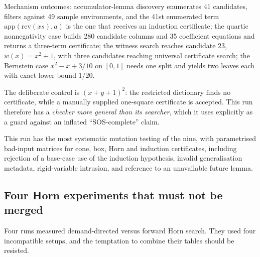 Mechanism outcomes: accumulator-lemma discovery enumerates 41 candidates,
filters against 49 sample environments, and the 41st enumerated term
$\mathrm{app}(\mathrm{rev}(xs),a)$ is the one that receives an induction
certificate; the quartic nonnegativity case builds 280 candidate columns and 35
coefficient equations and returns a three-term certificate; the witness search
reaches candidate 23, $w(x)=x^2+1$, with three candidates reaching universal
certificate search; the Bernstein case $x^2-x+3/10$ on $[0,1]$ needs one split
and yields two leaves each with exact lower bound $1/20$.

The deliberate control is $(x+y+1)^2$: the restricted dictionary finds no
certificate, while a manually supplied one-square certificate is accepted. This
run therefore has a \emph{checker more general than its searcher}, which it uses
explicitly as a guard against an inflated ``SOS-complete'' claim.

This run has the most systematic mutation testing of the nine, with parametrised
bad-input matrices for cone, box, Horn and induction certificates, including
rejection of a base-case use of the induction hypothesis, invalid generalisation
metadata, rigid-variable intrusion, and reference to an unavailable future
lemma.

\subsection{Four Horn experiments that must not be merged}

Four runs measured demand-directed versus forward Horn search. They used four
incompatible setups, and the temptation to combine their tables should be
resisted.

